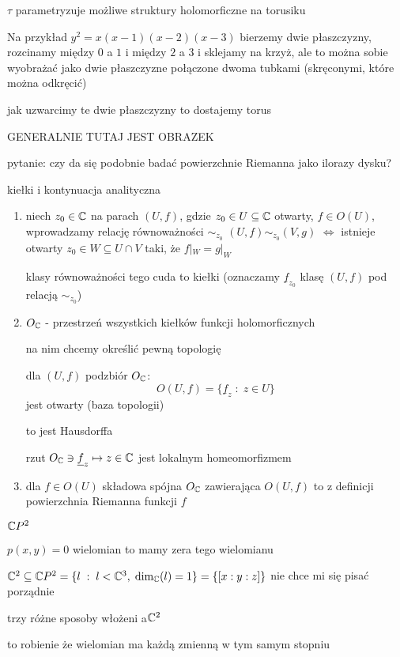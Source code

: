 $\tau$ parametryzuje możliwe struktury holomorficzne na torusiku

Na przykład $y^2=x(x-1)(x-2)(x-3)$ bierzemy dwie płaszczyzny, rozcinamy między $0$ a $1$ i między $2$ a $3$ i sklejamy na krzyż, ale to można sobie wyobrażać jako dwie płaszczyzne połączone dwoma tubkami (skręconymi, które można odkręcić)

jak uzwarcimy te dwie płaszczyzny to dostajemy torus

GENERALNIE TUTAJ JEST OBRAZEK

pytanie: czy da się podobnie badać powierzchnie Riemanna jako ilorazy dysku?

kiełki i kontynuacja analityczna

\begin{definition}{}{}
  \begin{enumerate}
    \item niech $z_0\in\mathbb{C}$ na parach $(U, f)$, gdzie $z_0\in U\subseteq \mathbb{C}$ otwarty, $f\in O(U)$, wprowadzamy relację równoważności $\sim_{z_0}$ $(U,f)\sim_{z_0}(V, g)$ $\iff$ istnieje otwarty $z_0\in W\subseteq U\cap V$ taki, że $f|_W=g|_W$

      klasy równoważności tego cuda to kiełki (oznaczamy $\underline{f}_{z_0}$ klasę $(U, f)$ pod relacją $\sim_{z_0}$) 
    \item $O_{\mathbb{C}}$ - przestrzeń wszystkich kiełków funkcji holomorficznych

      na nim chcemy określić pewną topologię

      dla $(U, f)$ podzbiór $O_{\mathbb{C}}$: 
      $$O(U, f)=\{\underline{f}_z\;:\;z\in U\}$$
      jest otwarty (baza topologii)

      to jest Hausdorffa
    
      rzut $O_{\mathbb{C}}\ni \underline{f}_z\mapsto z\in\mathbb{C}$ jest lokalnym homeomorfizmem
    \item dla $f\in O(U)$ składowa spójna $O_{\mathbb{C}}$ zawierająca $O(U,f)$ to z definicji powierzchnia Riemanna funkcji $f$
  \end{enumerate}
\end{definition}

$\mathbb{C} P^2$

$p(x,y)=0$ wielomian to mamy zera tego wielomianu

$\mathbb{C}^2\subseteq \mathbb{C} P^2=\{l\;:\;l<\mathbb{C}^3,\;\dim_{\mathbb{C}}(l)=1\}=\{[x:y:z]\}$ nie chce mi się pisać porządnie

trzy różne sposoby włożeni a$\mathbb{C}^2$

to robienie że wielomian ma każdą zmienną w tym samym stopniu






